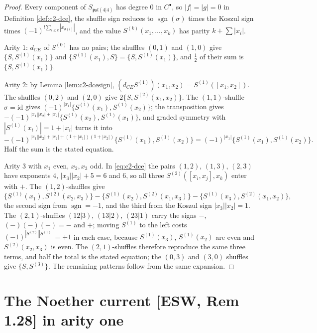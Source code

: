 \begin{proof}
Every component of $S_{\mathfrak{psl}(4|4)}$ has degree $0$ in $C^\bullet$, so $|f|=|g|=0$ in Definition \ref{def:c2-dce}, the shuffle sign reduces to $\operatorname{sgn}(\sigma)$ times the Koszul sign times $(-1)^{l\sum_{i\le k}|x_{\sigma(i)}|}$, and the value $S^{(k)}(x_1,\dots,x_k)$ has parity $k+\sum|x_i|$.

Arity $1$: $d_{CE}$ of $S^{(0)}$ has no pairs; the shuffles $(0,1)$ and $(1,0)$ give $\{S,S^{(1)}(x_1)\}$ and $\{S^{(1)}(x_1),S\}=\{S,S^{(1)}(x_1)\}$, and $\tfrac12$ of their sum is $\{S,S^{(1)}(x_1)\}$.

Arity $2$: by Lemma \ref{lem:c2-dcesign}, $(d_{CE}S^{(1)})(x_1,x_2)=S^{(1)}([x_1,x_2])$. The shuffles $(0,2)$ and $(2,0)$ give $2\{S,S^{(2)}(x_1,x_2)\}$. The $(1,1)$-shuffle $\sigma=\mathrm{id}$ gives $(-1)^{|x_1|}\{S^{(1)}(x_1),S^{(1)}(x_2)\}$; the transposition gives $-(-1)^{|x_1||x_2|+|x_2|}\{S^{(1)}(x_2),S^{(1)}(x_1)\}$, and graded symmetry with $|S^{(1)}(x_i)|=1+|x_i|$ turns it into
\[
-(-1)^{|x_1||x_2|+|x_2|+(1+|x_1|)(1+|x_2|)}\{S^{(1)}(x_1),S^{(1)}(x_2)\}=(-1)^{|x_1|}\{S^{(1)}(x_1),S^{(1)}(x_2)\}.
\]
Half the sum is the stated equation.

Arity $3$ with $x_1$ even, $x_2,x_3$ odd. In \eqref{eq:c2-dce} the pairs $(1,2)$, $(1,3)$, $(2,3)$ have exponents $4$, $|x_3||x_2|+5=6$ and $6$, so all three $S^{(2)}([x_i,x_j],x_k)$ enter with $+$. The $(1,2)$-shuffles give
\[
\{S^{(1)}(x_1),S^{(2)}(x_2,x_3)\}-\{S^{(1)}(x_2),S^{(2)}(x_1,x_3)\}-\{S^{(1)}(x_3),S^{(2)}(x_1,x_2)\},
\]
the second sign from $\operatorname{sgn}=-1$, and the third from the Koszul sign $|x_3||x_2|=1$. The $(2,1)$-shuffles $(12|3)$, $(13|2)$, $(23|1)$ carry the signs $-$, $(-)(-)(-)=-$ and $+$; moving $S^{(1)}$ to the left costs $(-1)^{|S^{(2)}||S^{(1)}|}=+1$ in each case, because $S^{(1)}(x_3)$, $S^{(1)}(x_2)$ are even and $S^{(2)}(x_2,x_3)$ is even. The $(2,1)$-shuffles therefore reproduce the same three terms, and half the total is the stated equation; the $(0,3)$ and $(3,0)$ shuffles give $\{S,S^{(3)}\}$. The remaining patterns follow from the same expansion.
\end{proof}

\section{The Noether current [ESW, Rem 1.28] in arity one}

